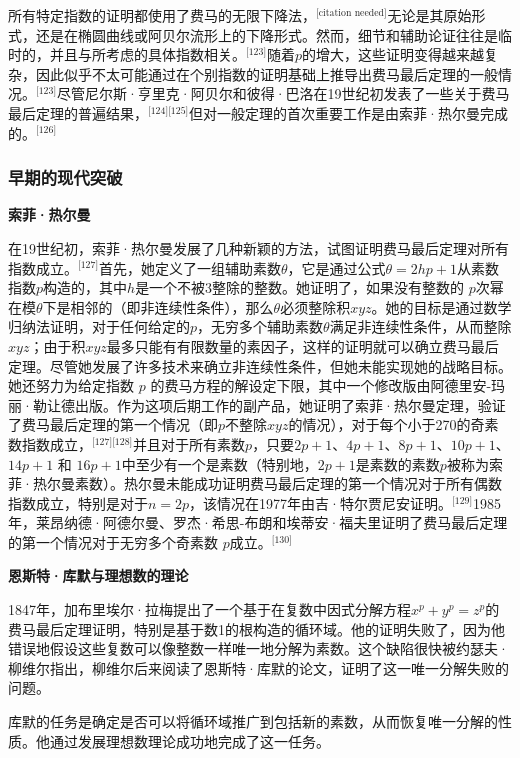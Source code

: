 所有特定指数的证明都使用了费马的无限下降法，\(^\text{[citation needed]}\)无论是其原始形式，还是在椭圆曲线或阿贝尔流形上的下降形式。然而，细节和辅助论证往往是临时的，并且与所考虑的具体指数相关。\(^\text{[123]}\)随着\( p \)的增大，这些证明变得越来越复杂，因此似乎不太可能通过在个别指数的证明基础上推导出费马最后定理的一般情况。\(^\text{[123]}\)尽管尼尔斯·亨里克·阿贝尔和彼得·巴洛在19世纪初发表了一些关于费马最后定理的普遍结果，\(^\text{[124][125]}\)但对一般定理的首次重要工作是由索菲·热尔曼完成的。\(^\text{[126]}\)
\subsubsection{早期的现代突破}  
\textbf{索菲·热尔曼} 

在19世纪初，索菲·热尔曼发展了几种新颖的方法，试图证明费马最后定理对所有指数成立。\(^\text{[127]}\)首先，她定义了一组辅助素数\( \theta \)，它是通过公式\( \theta = 2hp + 1 \)从素数指数\( p \)构造的，其中\( h \)是一个不被3整除的整数。她证明了，如果没有整数的 \( p \)次幂在模\( \theta \)下是相邻的（即非连续性条件），那么\( \theta \)必须整除积\( xyz \)。她的目标是通过数学归纳法证明，对于任何给定的\( p \)，无穷多个辅助素数\( \theta \)满足非连续性条件，从而整除\( xyz \)；由于积\( xyz \)最多只能有有限数量的素因子，这样的证明就可以确立费马最后定理。尽管她发展了许多技术来确立非连续性条件，但她未能实现她的战略目标。她还努力为给定指数 \( p \) 的费马方程的解设定下限，其中一个修改版由阿德里安-玛丽·勒让德出版。作为这项后期工作的副产品，她证明了索菲·热尔曼定理，验证了费马最后定理的第一个情况（即\( p \)不整除\( xyz \)的情况），对于每个小于270的奇素数指数成立，\(^\text{[127][128]}\)并且对于所有素数\( p \)，只要\( 2p + 1 \)、\( 4p + 1 \)、\( 8p + 1 \)、\( 10p + 1 \)、\( 14p + 1 \) 和 \( 16p + 1 \)中至少有一个是素数（特别地，\( 2p + 1 \)是素数的素数\( p \)被称为索菲·热尔曼素数）。热尔曼未能成功证明费马最后定理的第一个情况对于所有偶数指数成立，特别是对于\( n = 2p \)，该情况在1977年由吉·特尔贾尼安证明。\(^\text{[129]}\)1985年，莱昂纳德·阿德尔曼、罗杰·希思-布朗和埃蒂安·福夫里证明了费马最后定理的第一个情况对于无穷多个奇素数 \( p \)成立。\(^\text{[130]}\)

\textbf{恩斯特·库默与理想数的理论}  

1847年，加布里埃尔·拉梅提出了一个基于在复数中因式分解方程\( x^p + y^p = z^p \)的费马最后定理证明，特别是基于数1的根构造的循环域。他的证明失败了，因为他错误地假设这些复数可以像整数一样唯一地分解为素数。这个缺陷很快被约瑟夫·柳维尔指出，柳维尔后来阅读了恩斯特·库默的论文，证明了这一唯一分解失败的问题。

库默的任务是确定是否可以将循环域推广到包括新的素数，从而恢复唯一分解的性质。他通过发展理想数理论成功地完成了这一任务。

